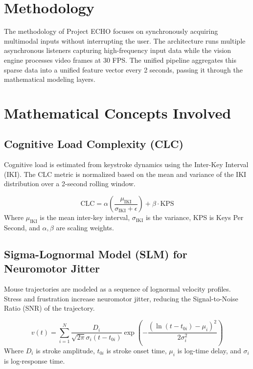 \documentclass[11pt,a4paper]{article}
\begin{document}
\section{Methodology}
The methodology of Project ECHO focuses on synchronously acquiring multimodal inputs without interrupting the user. The architecture runs multiple asynchronous listeners capturing high-frequency input data while the vision engine processes video frames at 30 FPS. The unified pipeline aggregates this sparse data into a unified feature vector every 2 seconds, passing it through the mathematical modeling layers.

\section{Mathematical Concepts Involved}

\subsection{Cognitive Load Complexity (CLC)}
Cognitive load is estimated from keystroke dynamics using the Inter-Key Interval (IKI). The CLC metric is normalized based on the mean and variance of the IKI distribution over a 2-second rolling window.

\begin{equation}
    \text{CLC} = \alpha \left(\frac{\mu_{\text{IKI}}}{\sigma_{\text{IKI}} + \epsilon}\right) + \beta \cdot \text{KPS}
\end{equation}
Where $\mu_{\text{IKI}}$ is the mean inter-key interval, $\sigma_{\text{IKI}}$ is the variance, KPS is Keys Per Second, and $\alpha, \beta$ are scaling weights.

\subsection{Sigma-Lognormal Model (SLM) for Neuromotor Jitter}
Mouse trajectories are modeled as a sequence of lognormal velocity profiles. Stress and frustration increase neuromotor jitter, reducing the Signal-to-Noise Ratio (SNR) of the trajectory.

\begin{equation}
    v(t) = \sum_{i=1}^{N} \frac{D_i}{\sqrt{2\pi} \sigma_i (t - t_{0i})} \exp \left( - \frac{(\ln(t - t_{0i}) - \mu_i)^2}{2\sigma_i^2} \right)
\end{equation}
Where $D_i$ is stroke amplitude, $t_{0i}$ is stroke onset time, $\mu_i$ is log-time delay, and $\sigma_i$ is log-response time.
\end{document}
